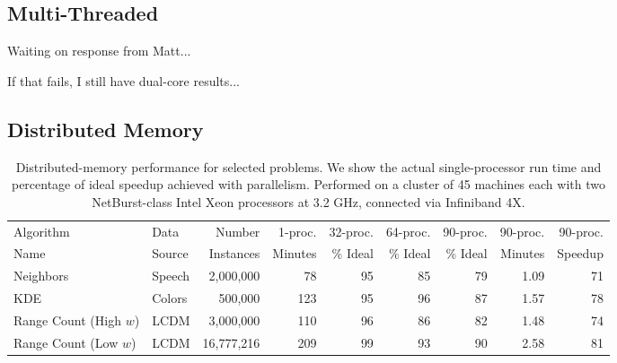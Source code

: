 \documentclass[twoside,leqno,twocolumn]{article}
\newcommand{\fig}[1]{Figure~\ref{fig:#1}}
\begin{document}
\subsection{Multi-Threaded}

Waiting on response from Matt...

If that fails, I still have dual-core results...


\subsection{Distributed Memory}


\begin{table}
  \centering
  \begin{tabular}{|l|l|r|r||r|r|r||r|r|}
    \hline
    Algorithm               & Data      & Number     & 1-proc. & 32-proc.  & 64-proc.  & 90-proc.  & 90-proc. & 90-proc.
    \\
    Name                    & Source    & Instances  & Minutes & \% Ideal & \% Ideal & \% Ideal & Minutes & Speedup
    \\ \hline \hline
    Neighbors               & Speech    & 2,000,000  & 78  & 95 & 85 & 79 & 1.09 & 71
    \\ \hline
    KDE                     & Colors    & 500,000    & 123 & 95 & 96 & 87 & 1.57 & 78
    \\ \hline
    Range Count (High $w$)  & LCDM      & 3,000,000  & 110 & 96 & 86 & 82 & 1.48 & 74
    \\ \hline
    Range Count (Low $w$)   & LCDM      & 16,777,216 & 209 & 99 & 93 & 90 & 2.58 & 81
    \\ \hline
  \end{tabular}
  \caption{
  \label{tab:distributed}
  Distributed-memory performance for selected problems.
  We show the actual single-processor run time and percentage of ideal speedup achieved with parallelism.
  Performed on a cluster of 45 machines each with two NetBurst-class Intel Xeon processors at 3.2 GHz, connected via Infiniband 4X.
  }
\end{table}
\end{document}
